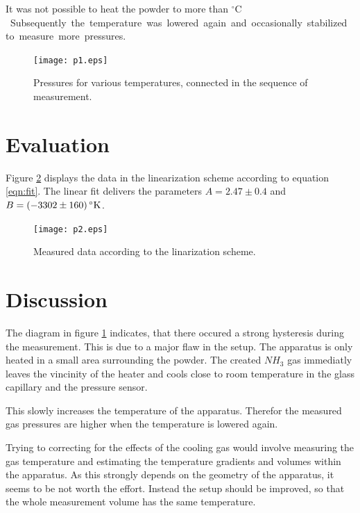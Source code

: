 \documentclass[english,twocolumn,DIV21,a4,10pt]{scrartcl}
\begin{document}
  It was not possible to heat the powder to more than
  \unit[145]{${}^\circ\textrm{C}$}. Subsequently the temperature was
  lowered again and occasionally stabilized to measure more pressures.

  \begin{figure}[htbp]
    \centering
    \texttt{[image: p1.eps]}
    \caption{Pressures for various temperatures, connected in the sequence of measurement.}
    \label{fig:meas}
  \end{figure}

\section{Evaluation}
Figure \ref{fig:eval} displays the data in the linearization scheme
according to equation \eqref{eqn:fit}. The linear fit delivers the
parameters $A=2.47\pm0.4$ and
$B=\unit[(-3302\pm160)]{{}^\circ\textrm{K}}$.
  \begin{figure}[htbp]
    \centering
    \texttt{[image: p2.eps]}
    \caption{Measured data according to the linarization scheme.}
    \label{fig:eval}
  \end{figure}
\section{Discussion}
The diagram in figure \ref{fig:meas} indicates, that there occured a
strong hysteresis during the measurement. This is due to a major flaw
in the setup. The apparatus is only heated in a small area surrounding
the powder. The created $NH_3$ gas immediatly leaves the vincinity of
the heater and cools close to room temperature in the glass capillary
and the pressure sensor.

This slowly increases the temperature of the apparatus. Therefor the
measured gas pressures are higher when the temperature is lowered
again.

Trying to correcting for the effects of the cooling gas would involve
measuring the gas temperature and estimating the temperature gradients
and volumes within the apparatus. As this strongly depends on the
geometry of the apparatus, it seems to be not worth the effort.
Instead the setup should be improved, so that the whole measurement
volume has the same temperature.
\end{document}
